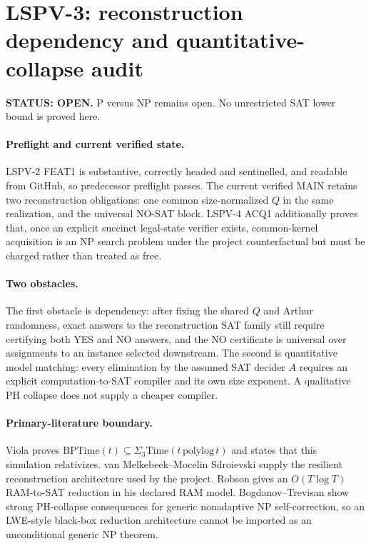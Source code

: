 \documentclass[11pt]{article}
\begin{document}
\section*{LSPV-3: reconstruction dependency and quantitative-collapse audit}
\textbf{STATUS: OPEN.} P versus NP remains open. No unrestricted SAT lower bound is proved here.

\paragraph{Preflight and current verified state.}
LSPV-2 FEAT1 is substantive, correctly headed and sentinelled, and readable from GitHub, so predecessor preflight passes. The current verified MAIN retains two reconstruction obligations: one common size-normalized $Q$ in the same realization, and the universal NO-SAT block. LSPV-4 ACQ1 additionally proves that, once an explicit succinct legal-state verifier exists, common-kernel acquisition is an NP search problem under the project counterfactual but must be charged rather than treated as free.

\paragraph{Two obstacles.}
The first obstacle is dependency: after fixing the shared $Q$ and Arthur randomness, exact answers to the reconstruction SAT family still require certifying both YES and NO answers, and the NO certificate is universal over assignments to an instance selected downstream. The second is quantitative model matching: every elimination by the assumed SAT decider $A$ requires an explicit computation-to-SAT compiler and its own size exponent. A qualitative PH collapse does not supply a cheaper compiler.

\paragraph{Primary-literature boundary.}
Viola proves $\mathrm{BPTime}(t)\subseteq\Sigma_3\mathrm{Time}(t\,\mathrm{polylog}\,t)$ and states that this simulation relativizes. van Melkebeek--Mocelin Sdroievski supply the resilient reconstruction architecture used by the project. Robson gives an $O(T\log T)$ RAM-to-SAT reduction in his declared RAM model. Bogdanov--Trevisan show strong PH-collapse consequences for generic nonadaptive NP self-correction, so an LWE-style black-box reduction architecture cannot be imported as an unconditional generic NP theorem.
\end{document}
